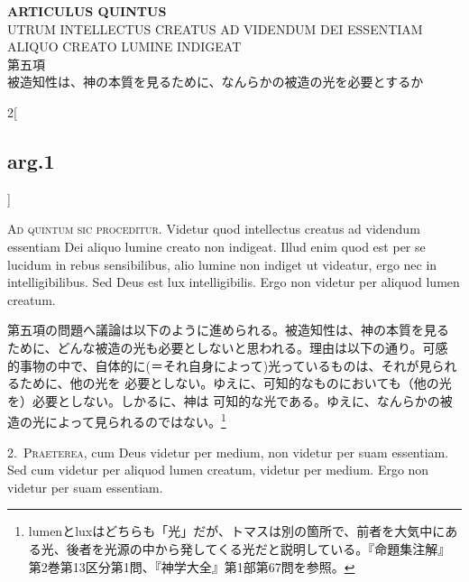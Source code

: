 \documentclass[paper=a4paper,fontsize=10pt,jafontsize=9pt,titlepage]{jlreq}
\begin{document}
\begin{center}
{\Large {\bfseries ARTICULUS QUINTUS}}\\
{\large UTRUM INTELLECTUS CREATUS AD VIDENDUM DEI ESSENTIAM\\
ALIQUO CREATO LUMINE INDIGEAT}\\
{\large 第五項\\
被造知性は、神の本質を見るために、なんらかの被造の光を必要とするか}
\end{center}

{}
\setcounter{section}{5}
\setcounter{subsection}{0}

\begin{paracol}{2}[\subsection{arg.1}]

{\huge A}{\scshape  d quintum sic proceditur}. Videtur quod intellectus creatus ad
 videndum essentiam Dei aliquo lumine creato non indigeat. Illud enim
 quod est per se lucidum in rebus sensibilibus, alio lumine non indiget
 ut videatur, ergo nec in intelligibilibus. Sed Deus est lux
 intelligibilis. Ergo non videtur per aliquod lumen creatum.

\switchcolumn

第五項の問題へ議論は以下のように進められる。被造知性は、神の本質を見る
ために、どんな被造の光も必要としないと思われる。理由は以下の通り。可感
的事物の中で、自体的に(＝それ自身によって)光っているものは、それが見られるために、他の光を
必要としない。ゆえに、可知的なものにおいても（他の光を）必要としない。しかるに、神は
可知的な光である。ゆえに、なんらかの被造の光によって見られるのではない。\footnote{lumenとluxはどちらも「光」だが、トマスは別の箇所で、前者を大気中にある光、後者を光源の中から発してくる光だと説明している。『命題集注解』第2巻第13区分第1問、『神学大全』第1部第67問を参照。}


2.~{\scshape Praeterea}, cum Deus videtur per medium, non videtur per suam
essentiam. Sed cum videtur per aliquod lumen creatum, videtur per
medium. Ergo non videtur per suam essentiam.

\switchcolumn


\end{paracol}
\end{document}
